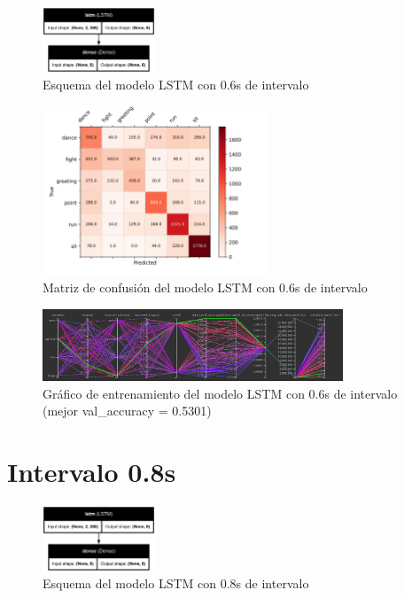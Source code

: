 \begin{figure}[H]
    \centering
    \includegraphics[width=0.3\textwidth]{Imagenes/Bitmap/best-lstm0.6.png}
    \caption{Esquema del modelo LSTM con 0.6s de intervalo}
    \label{fig:lstm-0.6-final}
\end{figure}

\begin{figure}[H]
    \centering
    \includegraphics[width=0.6\textwidth]{Imagenes/Bitmap/CM_best-lstm0.6.png}
    \caption{Matriz de confusión del modelo LSTM con 0.6s de intervalo}
    \label{fig:lstm-0.6-matriz}
\end{figure}

\begin{figure}[H]
    \centering
    \includegraphics[width=0.8\textwidth]{Imagenes/Bitmap/tb-lstm-0.6.png}
    \caption{Gráfico de entrenamiento del modelo LSTM con 0.6s de intervalo (mejor val\_accuracy = 0.5301)}
    \label{fig:lstm-0.6-grafico}
\end{figure}

\section{Intervalo 0.8s}

\begin{figure}[H]
    \centering
    \includegraphics[width=0.3\textwidth]{Imagenes/Bitmap/best-lstm0.8.png}
    \caption{Esquema del modelo LSTM con 0.8s de intervalo}
    \label{fig:lstm-0.8-final}
\end{figure}

